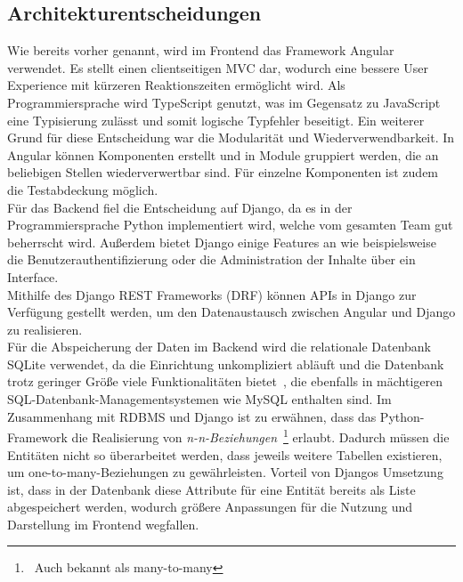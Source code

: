 \documentclass[conference]{IEEEtran}
\begin{document}
\subsection{Architekturentscheidungen}\label{arch-choices}
Wie bereits vorher genannt, wird im Frontend das Framework Angular verwendet. Es stellt einen clientseitigen MVC dar, wodurch eine bessere User Experience mit kürzeren Reaktionszeiten ermöglicht wird. Als Programmiersprache wird TypeScript genutzt, was im Gegensatz zu JavaScript eine Typisierung zulässt und somit logische Typfehler beseitigt. Ein weiterer Grund für diese Entscheidung war die Modularität und Wiederverwendbarkeit. In Angular können Komponenten erstellt und in Module gruppiert werden, die an beliebigen Stellen wiederverwertbar sind. Für einzelne Komponenten ist zudem die Testabdeckung möglich.\\
Für das Backend fiel die Entscheidung auf Django, da es in der Programmiersprache Python implementiert wird, welche vom gesamten Team gut beherrscht wird. Außerdem bietet Django einige Features an wie beispielsweise die Benutzerauthentifizierung oder die Administration der Inhalte über ein Interface.\\
Mithilfe des Django REST Frameworks (DRF) können APIs in Django zur Verfügung gestellt werden, um den Datenaustausch zwischen Angular und Django zu realisieren.\\
Für die Abspeicherung der Daten im Backend wird die relationale Datenbank SQLite verwendet, da die Einrichtung unkompliziert abläuft und die Datenbank trotz geringer Größe viele Funktionalitäten bietet~\cite{sqlite}, die ebenfalls in mächtigeren SQL-Datenbank-Managementsystemen wie MySQL enthalten sind. Im Zusammenhang mit RDBMS und Django ist zu erwähnen, dass das Python-Framework die Realisierung von \textit{n-n-Beziehungen}~\footnote{~Auch bekannt als many-to-many} erlaubt. Dadurch müssen die Entitäten nicht so überarbeitet werden, dass jeweils weitere Tabellen existieren, um one-to-many-Beziehungen zu gewährleisten. Vorteil von Djangos Umsetzung ist, dass in der Datenbank diese Attribute für eine Entität bereits als Liste abgespeichert werden, wodurch größere Anpassungen für die Nutzung und Darstellung im Frontend wegfallen.
\end{document}
